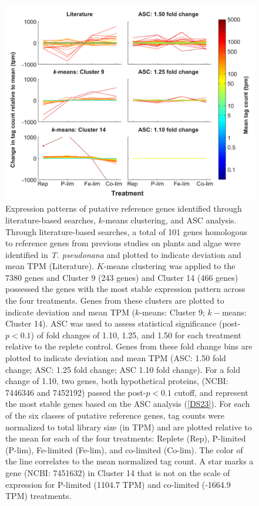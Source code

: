 \begin{figure}[p!]
  \centering
    \includegraphics[width=1\textwidth]{Images/C2_Figure1_v6.pdf}
    \caption[Expression patterns of putative reference genes]{Expression patterns of putative reference genes identified through literature-based searches, $k$-means clustering, and ASC analysis. Through literature-based searches, a total of 101 genes homologous to reference genes from previous studies on plants and algae were identified in \textit{T. pseudonana} and plotted to indicate deviation and mean TPM (Literature). $K$-means clustering was applied to the 7380 genes and Cluster 9 (243 genes) and Cluster 14 (466 genes) possessed the genes with the most stable expression pattern across the four treatments. Genes from these clusters are plotted to indicate deviation and mean TPM ($k$-means: Cluster 9; $k-$means: Cluster 14). ASC was used to assess statistical significance (post-$p < 0.1$) of fold changes of 1.10, 1.25, and 1.50 for each treatment relative to the replete control. Genes from these fold change bins are plotted to indicate deviation and mean TPM (ASC: 1.50 fold change; ASC: 1.25 fold change; ASC 1.10 fold change). For a fold change of 1.10, two genes, both hypothetical proteins, (NCBI: 7446346 and 7452192) passed the post-$p < 0.1$ cutoff, and represent the most stable genes based on the ASC analysis (\ref{DS23}). For each of the six classes of putative reference genes, tag counts were normalized to total library size (in TPM) and are plotted relative to the mean for each of the four treatments: Replete (Rep), P-limited (P-lim), Fe-limited (Fe-lim), and co-limited (Co-lim). The color of the line correlates to the mean normalized tag count. A star marks a gene (NCBI: 7451632) in Cluster 14 that is not on the scale of expression for P-limited (1104.7 TPM) and co-limited (-1664.9 TPM) treatments. }
  \label{fig:c2f1}
\end{figure}

